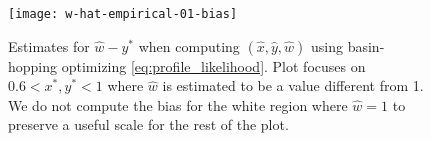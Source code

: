 \begin{figure}
\centering
\texttt{[image: w-hat-empirical-01-bias]}
\caption{
    Estimates for $\hat{w}-y^*$ when computing $(\hat{x}, \hat{y}, \hat{w})$ using basin-hopping \cite{Wales1997} optimizing \eqref{eq:profile_likelihood}.
    Plot focuses on $0.6 < x^*, y^* < 1$ where $\hat{w}$ is estimated to be a value different from 1.
    We do not compute the bias for the white region where $\hat{w}=1$ to preserve a useful scale for the rest of the plot.
}
\label{fig:bl-general-bias}
\end{figure}

